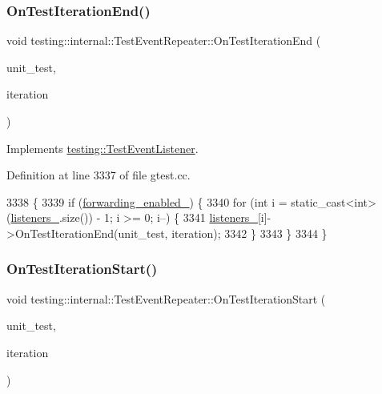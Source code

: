 \subsubsection{\texorpdfstring{On\+Test\+Iteration\+End()}{OnTestIterationEnd()}}
{\footnotesize\ttfamily void testing\+::internal\+::\+Test\+Event\+Repeater\+::\+On\+Test\+Iteration\+End (\begin{DoxyParamCaption}\item[{const \hyperlink{classtesting_1_1UnitTest}{Unit\+Test} \&}]{unit\+\_\+test,  }\item[{int}]{iteration }\end{DoxyParamCaption})\hspace{0.3cm}{\ttfamily [virtual]}}



Implements \hyperlink{classtesting_1_1TestEventListener_a550fdb3e55726e4cefa09f5697941425}{testing\+::\+Test\+Event\+Listener}.



Definition at line 3337 of file gtest.\+cc.


\begin{DoxyCode}
3338                                                           \{
3339   \textcolor{keywordflow}{if} (\hyperlink{classtesting_1_1internal_1_1TestEventRepeater_a1f7e494642d653eaad800504510d18a3}{forwarding\_enabled\_}) \{
3340     \textcolor{keywordflow}{for} (\textcolor{keywordtype}{int} i = static\_cast<int>(\hyperlink{classtesting_1_1internal_1_1TestEventRepeater_a1c08e9302639108588d764b671c54825}{listeners\_}.size()) - 1; i >= 0; i--) \{
3341       \hyperlink{classtesting_1_1internal_1_1TestEventRepeater_a1c08e9302639108588d764b671c54825}{listeners\_}[i]->OnTestIterationEnd(unit\_test, iteration);
3342     \}
3343   \}
3344 \}
\end{DoxyCode}
\mbox{\label{classtesting_1_1internal_1_1TestEventRepeater_a4062b3f070bb6531ab8494c13d3635d3}} 
\subsubsection{\texorpdfstring{On\+Test\+Iteration\+Start()}{OnTestIterationStart()}}
{\footnotesize\ttfamily void testing\+::internal\+::\+Test\+Event\+Repeater\+::\+On\+Test\+Iteration\+Start (\begin{DoxyParamCaption}\item[{const \hyperlink{classtesting_1_1UnitTest}{Unit\+Test} \&}]{unit\+\_\+test,  }\item[{int}]{iteration }\end{DoxyParamCaption})\hspace{0.3cm}{\ttfamily [virtual]}}



